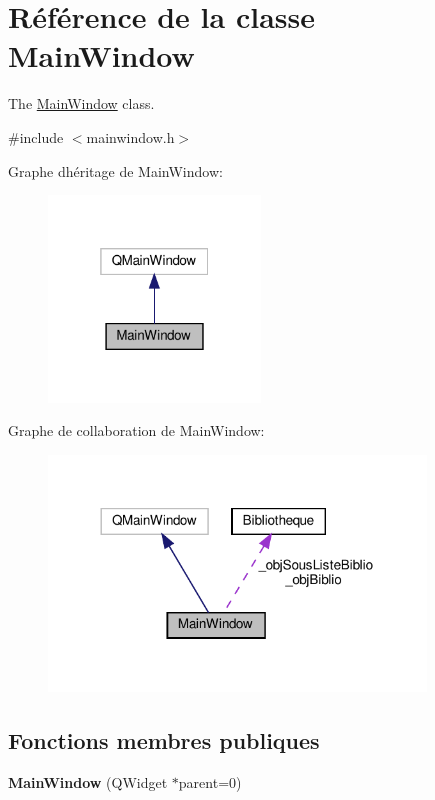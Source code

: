 \hypertarget{classMainWindow}{}\section{Référence de la classe Main\+Window}
\label{classMainWindow}


The \hyperlink{classMainWindow}{Main\+Window} class.  




{\ttfamily \#include $<$mainwindow.\+h$>$}



Graphe d\textquotesingle{}héritage de Main\+Window\+:
\nopagebreak
\begin{figure}[H]
\begin{center}
\leavevmode
\includegraphics[width=160pt]{classMainWindow__inherit__graph}
\end{center}
\end{figure}


Graphe de collaboration de Main\+Window\+:
\nopagebreak
\begin{figure}[H]
\begin{center}
\leavevmode
\includegraphics[width=284pt]{classMainWindow__coll__graph}
\end{center}
\end{figure}
\subsection*{Fonctions membres publiques}
\begin{DoxyCompactItemize}
\item 
\mbox{\label{classMainWindow_a8b244be8b7b7db1b08de2a2acb9409db}} 
{\bfseries Main\+Window} (Q\+Widget $\ast$parent=0)
\end{DoxyCompactItemize}
